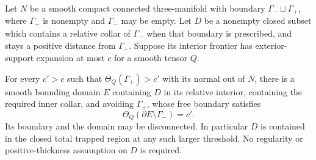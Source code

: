 \begin{lemma}
\label{n3:domains:weak-support}
Let $N$ be a smooth compact connected three-manifold with boundary
$\Gamma_-\sqcup\Gamma_+$, where $\Gamma_+$ is nonempty and
$\Gamma_-$ may be empty.  Let $D$ be a nonempty closed subset which
contains a relative collar of $\Gamma_-$ when that boundary is
prescribed, and stays a positive distance from $\Gamma_+$.  Suppose
its interior frontier has exterior-support expansion at most $c$
for a smooth tensor $Q$.

For every $c'>c$ such that
$\Theta_Q(\Gamma_+)>c'$ with its normal out of $N$, there is a
smooth bounding domain $E$ containing $D$ in its relative interior,
containing the required inner collar, and avoiding $\Gamma_+$,
whose free boundary satisfies
\begin{equation}\label{n3:domains:smooth-enclosure-expansion}
 \Theta_Q(\partial E\setminus\Gamma_-)=c'.
\end{equation}
Its boundary and the domain may be disconnected.  In particular $D$
is contained in the closed total trapped region at any such larger
threshold.  No regularity or positive-thickness assumption on $D$
is required.
\end{lemma}

